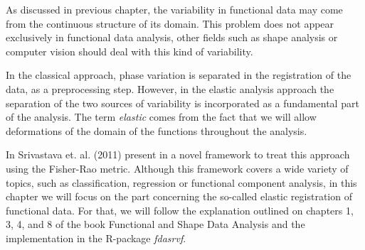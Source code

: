 As discussed in previous chapter, the variability in functional data may come
from the continuous structure of its domain. This problem does not appear
exclusively in functional data analysis, other fields such as shape analysis or
computer vision should deal with this kind of variability.

In the classical approach, phase variation is separated in the registration of
the data, as a preprocessing step. However, in the elastic analysis approach the
separation of the two sources of variability is incorporated as a fundamental
part of the analysis. The term \textit{elastic} comes from the fact that we will allow
deformations of the domain of the functions throughout the analysis.

In Srivastava et. al. (2011) present in \cite{Srivastava2011} a novel
framework to treat this approach using the Fisher-Rao metric. Although this
framework covers a wide variety of topics, such as classification, regression or
functional component analysis\cite{Tucker2014}, in this chapter we will focus
on the part concerning the so-called elastic registration of functional data.
For that, we will follow the explanation outlined on chapters 1, 3, 4, and 8 of
the book Functional and Shape Data Analysis \cite{Srivastava2016} and
the implementation in the R-package \textit{fdasrvf}\cite{fdasrvf}.
